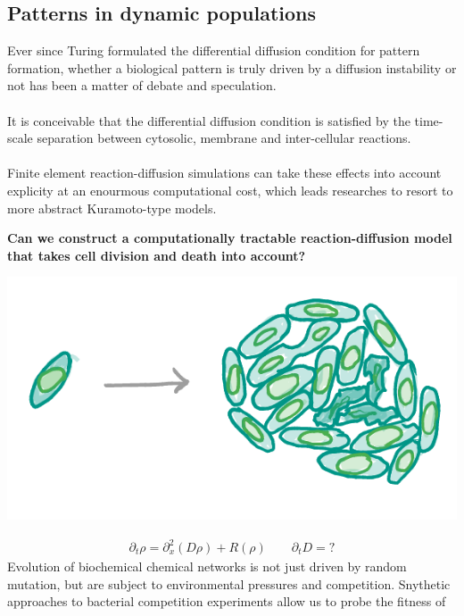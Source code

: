 \documentclass[a0,portrait]{a0poster}
\begin{document}
\begin{multicols}{3}
\section{Patterns in dynamic populations}
Ever since Turing formulated the differential diffusion condition \cite{}
for pattern formation, whether a biological pattern is truly driven by a
diffusion instability or not has been a matter of debate and speculation.
\\\\
It is conceivable that the differential diffusion condition is satisfied
by the time-scale separation between cytosolic, membrane and inter-cellular
reactions.
\\\\
Finite element reaction-diffusion simulations can take these effects into
account explicity at an enourmous computational cost, which leads researches to
resort to more abstract Kuramoto-type models.
\\
\begin{tcolorbox}[boxrule=2pt,arc=3.4pt,boxsep=2mm]
\begin{center}\color{DarkRed}
\textbf{Can we construct a computationally tractable reaction-diffusion model
that takes cell division and death into account?}
\end{center}
\end{tcolorbox}
\begin{center}
\includegraphics[width=0.9\linewidth]{population}
\end{center}
\large\begin{align*}
	\partial_t\rho=\partial_x^2(D\rho)+R(\rho)\qquad
	\partial_tD=?
\end{align*}
\normalsize
Evolution of biochemical chemical networks is not just driven by random mutation,
but are subject to environmental pressures and competition. Snythetic approaches
to bacterial competition experiments \cite{} allow us to probe the fitness of

\end{multicols}
\end{document}
